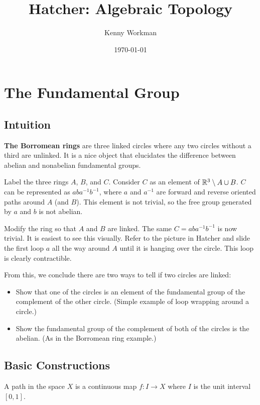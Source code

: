\documentclass[10pt]{article}
\title{Hatcher: Algebraic Topology}
\author{Kenny Workman}
\date{\today}
\begin{document}
\maketitle

\section{The Fundamental Group}

\subsection{Intuition}

\textbf{The Borromean rings} are three linked circles where any two circles without a third are unlinked. It is a nice object that elucidates the difference between abelian and nonabelian fundamental groups.

Label the three rings $A$, $B$, and $C$. Consider $C$ as an element of $\mathbb{R}^3 \setminus A \cup B$. $C$ can be represented as $aba^{-1}b^{-1}$, where $a$ and $a^{-1}$ are forward and reverse oriented paths around $A$ (and $B$). This element is not trivial, so the free group generated by $a$ and $b$ is not abelian.

Modify the ring so that $A$ and $B$ are linked. The same $C = aba^{-1}b^{-1}$ is now trivial. It is easiest to see this visually. Refer to the picture in Hatcher and slide the first loop $a$ all the way around $A$ until it is hanging over the circle. This loop is clearly contractible.

From this, we conclude there are two ways to tell if two circles are linked:

\begin{itemize}
	\item{Show that one of the circles is an element of the fundamental group of the complement of the other circle. (Simple example of loop wrapping around a circle.)}
	\item{Show the fundamental group of the complement of both of the circles is the abelian. (As in the Borromean ring example.)}
\end{itemize}

\subsection{Basic Constructions}

\begin{definition}[Path]
A path in the space $X$ is a continuous map $f: I \to X$ where $I$ is the unit interval $[0, 1]$.
\end{definition}
\end{document}
